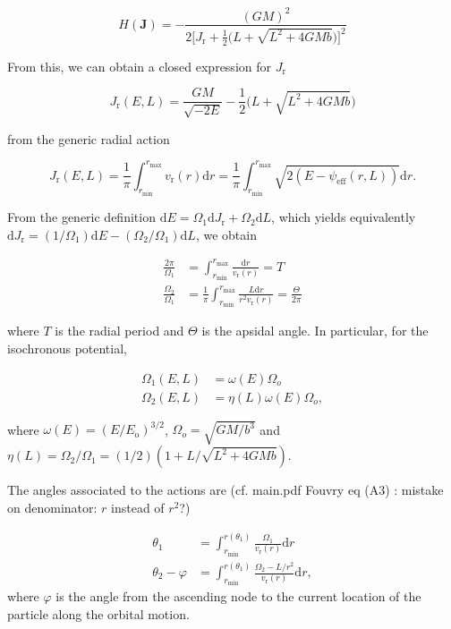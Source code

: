 \documentclass[11pt]{article}
\newcommand{\rr}{\mathrm{r}}
\newcommand{\ro}{\mathrm{o}}
\newcommand{\vr}{v_{\rr}}
\newcommand{\rd}{{\mathrm{d}}}
\newcommand{\rmax}{r_{\max}}
\newcommand{\rmin}{r_{\min}}
\newcommand{\psieff}{\psi_{\mathrm{eff}}}
\newcommand{\Jr}{J_{\mathrm{r}}}
\newcommand{\Eo}{E_{\ro}}
\newcommand{\bJ}{\boldsymbol{J}}
\begin{document}
\begin{equation}
  H(\bJ) = - \frac{(GM)^{2}}{2 \bigg[\Jr + \frac{1}{2} \bigg(L+\sqrt{L^{2}+4GMb}\bigg)\bigg]^{2}}
  \label{eq:HamiltionianIso}
\end{equation}

From this, we can obtain a closed expression for $\Jr$

\begin{equation}
  \Jr (E,L)= \frac{GM}{\sqrt{-2E}} - \frac{1}{2} \bigg(L+\sqrt{L^{2}+4GMb}\bigg)
  \label{eq:Jr_Iso}
\end{equation}

from the generic radial action

\begin{equation}
  \Jr (E,L)= \frac{1}{\pi} \int_{\rmin}^{\rmax} \vr(r) \rd r =  \frac{1}{\pi} \int_{\rmin}^{\rmax} \sqrt{2(E-\psieff(r,L))} \rd r .
  \label{eq:Jr_Generic}
\end{equation}

From the generic definition $\rd E = \Omega_{1} \rd \Jr + \Omega_{2} \rd L$, which yields equivalently $\rd \Jr = (1/\Omega_{1}) \rd E - (\Omega_{2}/\Omega_{1}) \rd L$, we obtain

\begin{align*}
  \frac{2\pi}{\Omega_{1}} &= \int_{\rmin}^{\rmax} \frac{\rd r}{\vr(r)} = T \\
  \frac{\Omega_{2}}{\Omega_{1}} &= \frac{1}{\pi} \int_{\rmin}^{\rmax} \frac{L \rd r}{r^{2} \vr(r)} = \frac{\Theta}{2\pi}
\end{align*}

where $T$ is the radial period and $\Theta$ is the apsidal angle. In particular, for the isochronous potential,

\begin{align*}
  \Omega_{1} (E,L)&= \omega(E) \Omega_{o} \\
  \Omega_{2} (E,L)&= \eta(L) \omega(E) \Omega_{o} ,
\end{align*}

where $\omega(E) = (E/\Eo)^{3/2}$, $\Omega_{o}=\sqrt{GM/b^{3}}$ and $\eta(L)=\Omega_{2}/\Omega_{1}=(1/2)(1+L/\sqrt{L^{2}+4GMb})$.

The angles associated to the actions are (cf. main.pdf Fouvry eq (A3) : mistake on denominator: $r$ instead of $r^{2}$?)

\begin{align*}
  \theta_{1} &= \int_{\rmin}^{r(\theta_{1})} \frac{\Omega_{1}}{\vr(r)} \rd r \\
  \theta_{2} - \varphi &= \int_{\rmin}^{r(\theta_{1})} \frac{\Omega_{2} - L/r^{2}}{\vr(r)} \rd r,
  \end{align*}
where $\varphi$ is the angle from the ascending node to the current location
of the particle along the orbital motion.
\end{document}
